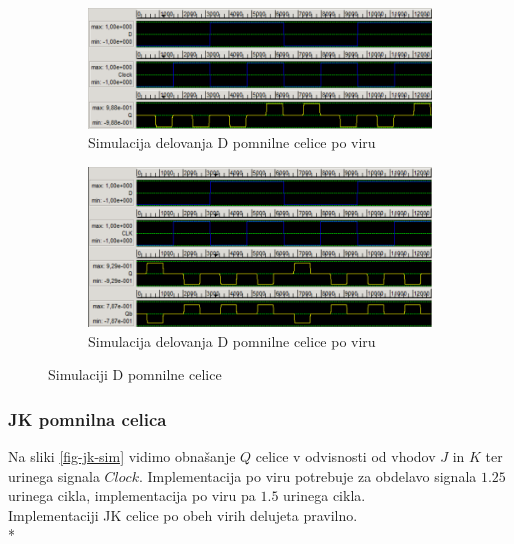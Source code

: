\documentclass[a4paper, 11pt]{article}
\begin{document}
\begin{figure}[h!]
	\begin{subfigure}[b]{\textwidth}
	\includegraphics[width=\textwidth]{../img/vir_4/sim_d.png}
	\caption{Simulacija delovanja D pomnilne celice po viru \cite{quantum_dot}}
	\label{fig-d-1-sim}
	\end{subfigure}
	\begin{subfigure}[b]{\textwidth}
	\includegraphics[width=\textwidth]{../img/vir_5/sim_d.png}
	\caption{Simulacija delovanja D pomnilne celice po viru \cite{a_novel_approach}}
	\label{fig-d-2-sim}
	\end{subfigure}
	\caption{Simulaciji D pomnilne celice}
	\label{fig-d-sim}
\end{figure}

\subsubsection{JK pomnilna celica}
Na sliki \ref{fig-jk-sim} vidimo obnašanje $Q$ celice v odvisnosti od vhodov $J$ in $K$ ter urinega signala $Clock$.
Implementacija po viru \cite{quantum_dot} potrebuje za obdelavo signala $1.25$ urinega cikla, implementacija po viru \cite{a_novel_approach} pa $1.5$ urinega cikla.\\
Implementaciji JK celice po obeh virih delujeta pravilno.\\*
\end{document}
